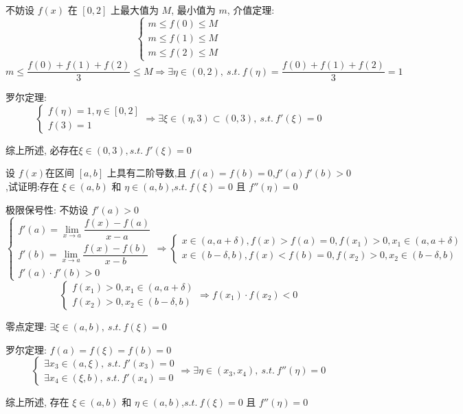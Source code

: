 \begin{solution}

	不妨设 $f(x)$ 在 $[0,2]$ 上最大值为 $M$, 最小值为 $m$, 介值定理:
	$$\begin{cases}
		m\leq f(0)\leq M\\
		m\leq f(1)\leq M\\
		m\leq f(2)\leq M
	\end{cases}$$
	$$m\leq \dfrac{f(0)+f(1)+f(2)}{3}\leq M
	\Rightarrow \exists \eta\in(0,2),\ s.t.\ f(\eta) = \dfrac{f(0)+f(1)+f(2)}{3}=1$$

	罗尔定理:
	$$\begin{cases} 
		f(\eta) = 1,\eta\in[0,2]\\
		f(3) =1
	\end{cases}\Rightarrow \exists \xi\in(\eta,3)\subset (0,3),\ s.t.\ f'(\xi) = 0$$

	综上所述, 必存在$\xi\in(0,3),s.t.\ f'(\xi)=0$
\end{solution}

\begin{example}[][Exam: 28.1.14]
	设 $f(x)$在区间 $[a,b]$ 上具有二阶导数,且 $f(a)=f(b)=0$,$f'(a)f'(b)>0$,试证明:存在 $\xi\in(a,b)$ 和 $\eta\in(a,b)$,$s.t.\ f(\xi)=0$ 且 $f''(\eta)=0$
\end{example}

\begin{solution}

	极限保号性: 不妨设 $f'(a) > 0$
	$$\begin{cases}
	f'(a) = \lim\limits_{x\to a} \dfrac{f(x)-f(a)}{x-a}\\
	f'(b) = \lim\limits_{x\to a} \dfrac{f(x)-f(b)}{x-b}\\
	f'(a)\cdot f'(b) > 0
	\end{cases}\Rightarrow 
	\begin{cases}
	x\in(a,a+\delta), f(x) > f(a) =0, f(x_{1}) > 0, x_{1}\in(a,a+\delta)\\
	x\in(b-\delta,b), f(x) < f(b) =0, f(x_{2}) > 0, x_{2}\in(b-\delta,b)
	\end{cases}$$
	$$\begin{cases}
	f(x_{1}) > 0, x_{1}\in(a,a+\delta)\\
	f(x_{2}) > 0, x_{2}\in(b-\delta,b)
	\end{cases}\Rightarrow f(x_{1})\cdot f(x_{2}) < 0$$

	零点定理: $\exists \xi\in(a,b),\ s.t.\ f(\xi) = 0$

	罗尔定理: $f(a) = f(\xi) =f(b) =0$
	$$\begin{cases}
	\exists x_{3}\in (a,\xi),\ s.t.\ f'(x_{3}) = 0\\
	\exists x_{4}\in (\xi,b),\ s.t.\ f'(x_{4}) = 0
	\end{cases}\Rightarrow \exists \eta\in (x_{3},x_{4}),\ s.t.\ f''(\eta) = 0$$

	综上所述, 存在 $\xi\in(a,b)$ 和 $\eta\in(a,b)$,$s.t.\ f(\xi)=0$ 且 $f''(\eta)=0$
\end{solution}

